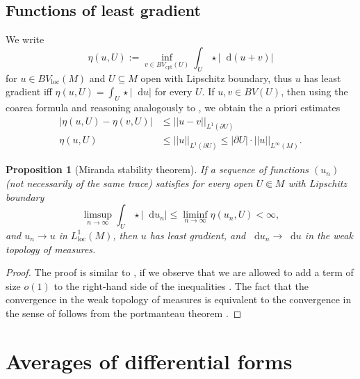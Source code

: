 \documentclass[reqno,11pt]{amsart}
\newcommand*\dif{\mathop{}\!\mathrm{d}}
\newcommand{\loc}{\mathrm{loc}}
\newcommand{\cpt}{\mathrm{cpt}}
\newtheorem{proposition}[theorem]{Proposition}
\theoremstyle{definition}
\numberwithin{equation}{section}
\begin{document}
\subsection{Functions of least gradient}
We write
$$\eta(u, U) := \inf_{v \in BV_\cpt(U)} \int_U \star |\dif(u + v)|$$
for $u \in BV_\loc(M)$ and $U \subseteq M$ open with Lipschitz boundary, thus $u$ has least gradient iff $\eta(u, U) = \int_U \star |\dif u|$ for every $U$.
If $u, v \in BV(U)$, then using the coarea formula and reasoning analogously to \cite[Lemma 5.6]{Giusti77}, we obtain the a priori estimates
\begin{align}
|\eta(u, U) - \eta(v, U)| &\leq ||u - v||_{L^1(\partial U)} \label{a priori estimate 1} \\
\eta(u, U) &\leq ||u||_{L^1(\partial U)} \leq |\partial U| \cdot ||u||_{L^\infty(M)}. \label{a priori estimate 2}
\end{align}

\begin{proposition}[Miranda stability theorem]\label{Miranda convergence}
If a sequence of functions $(u_n)$ (not necessarily of the same trace) satisfies for every open $U \Subset M$ with Lipschitz boundary
$$\limsup_{n \to \infty} \int_U \star |\dif u_n| \leq \liminf_{n \to \infty} \eta(u_n, U) < \infty,$$
and $u_n \to u$ in $L^1_\loc(M)$, then $u$ has least gradient, and $\dif u_n \to \dif u$ in the weak topology of measures.
\end{proposition}
\begin{proof}
The proof is similar to \cite[Teorema 3 and Osservazione 3]{Miranda67}, if we observe that we are allowed to add a term of size $o(1)$ to the right-hand side of the inequalities \cite[(2.8), (2.9), (2.13), and (2.14)]{Miranda67}.
The fact that the convergence in the weak topology of measures is equivalent to the convergence in the sense of \cite[Osservazione 3]{Miranda67} follows from the portmanteau theorem \cite[Theorem 13.16]{klenke2013probability}.
\end{proof}

\section{Averages of differential forms}\label{excess section}
\end{document}
